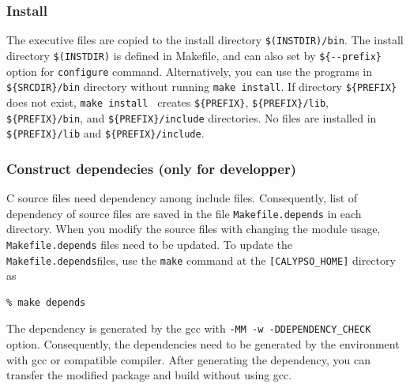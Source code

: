 \subsubsection{Install}
 The executive files are copied to the install directory \verb|$(INSTDIR)/bin|. The install directory \verb|$(INSTDIR)| is defined in Makefile, and can also set by  \verb|${--prefix}| option for \verb|configure| command. Alternatively, you can use the programs in \verb|${SRCDIR}/bin| directory without running \verb|make install|. If directory \verb|${PREFIX}| does not exist, \verb|make install | creates  \verb|${PREFIX}|,  \verb|${PREFIX}/lib|,  \verb|${PREFIX}/bin|, and  \verb|${PREFIX}/include| directories. No files are installed in \verb|${PREFIX}/lib| and \verb|${PREFIX}/include|.

\subsubsection{Construct dependecies (only for developper)}
C source files need dependency among include files. Consequently, list of dependency of source files are saved in the file \verb|Makefile.depends| in each directory. When you modify the source files with changing the module usage,  \verb|Makefile.depends| files need to be updated. To update the  \verb|Makefile.depends|files, use the  \verb|make| command at the \verb|[CALYPSO_HOME]| directory as \\
%
\begin{verbatim}
% make depends
\end{verbatim}

The dependency is generated by the gcc with \verb|-MM -w -DDEPENDENCY_CHECK| option. Consequently, the dependencies need to be generated by the environment with gcc or compatible compiler. After generating the dependency, you can transfer the modified package and build without using gcc.

